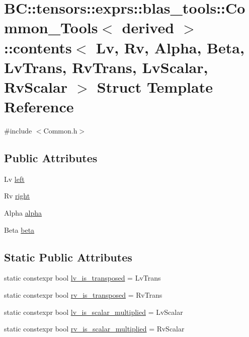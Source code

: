 \hypertarget{structBC_1_1tensors_1_1exprs_1_1blas__tools_1_1Common__Tools_1_1contents}{}\section{BC\+:\+:tensors\+:\+:exprs\+:\+:blas\+\_\+tools\+:\+:Common\+\_\+\+Tools$<$ derived $>$\+:\+:contents$<$ Lv, Rv, Alpha, Beta, Lv\+Trans, Rv\+Trans, Lv\+Scalar, Rv\+Scalar $>$ Struct Template Reference}
\label{structBC_1_1tensors_1_1exprs_1_1blas__tools_1_1Common__Tools_1_1contents}


{\ttfamily \#include $<$Common.\+h$>$}

\subsection*{Public Attributes}
\begin{DoxyCompactItemize}
\item 
Lv \hyperlink{structBC_1_1tensors_1_1exprs_1_1blas__tools_1_1Common__Tools_1_1contents_ae538d6e891495d3f3f06e1390991a745}{left}
\item 
Rv \hyperlink{structBC_1_1tensors_1_1exprs_1_1blas__tools_1_1Common__Tools_1_1contents_a3515e38305bda743b1b008bf3bbca51a}{right}
\item 
Alpha \hyperlink{structBC_1_1tensors_1_1exprs_1_1blas__tools_1_1Common__Tools_1_1contents_ac45492874ff04efc96982451240a8fd8}{alpha}
\item 
Beta \hyperlink{structBC_1_1tensors_1_1exprs_1_1blas__tools_1_1Common__Tools_1_1contents_ae9a126691a6939e6b7b554344d6ab84d}{beta}
\end{DoxyCompactItemize}
\subsection*{Static Public Attributes}
\begin{DoxyCompactItemize}
\item 
static constexpr bool \hyperlink{structBC_1_1tensors_1_1exprs_1_1blas__tools_1_1Common__Tools_1_1contents_a2ba758f02151cede45aba8f58dc48e74}{lv\+\_\+is\+\_\+transposed} = Lv\+Trans
\item 
static constexpr bool \hyperlink{structBC_1_1tensors_1_1exprs_1_1blas__tools_1_1Common__Tools_1_1contents_ac335e81c0594905f737813302dc4b838}{rv\+\_\+is\+\_\+transposed} = Rv\+Trans
\item 
static constexpr bool \hyperlink{structBC_1_1tensors_1_1exprs_1_1blas__tools_1_1Common__Tools_1_1contents_a2c959dc5dbb504b158698a43077b8d17}{lv\+\_\+is\+\_\+scalar\+\_\+multiplied} = Lv\+Scalar
\item 
static constexpr bool \hyperlink{structBC_1_1tensors_1_1exprs_1_1blas__tools_1_1Common__Tools_1_1contents_a2c7331298412fddb5426de9abc1bdd8b}{rv\+\_\+is\+\_\+scalar\+\_\+multiplied} = Rv\+Scalar
\end{DoxyCompactItemize}


